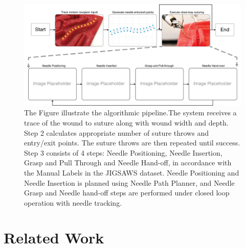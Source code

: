 \begin{figure}[!t]
\centering
\includegraphics[width=0.9\linewidth]{figures/fsm}
\caption{ The Figure illustrate the algorithmic pipeline.The system receives a trace of the wound to suture along with wound width and depth. Step 2 calculates appropriate number of suture throws and entry/exit points. The suture throws are then repeated until success. Step 3  consists of 4 steps: Needle Positioning, Needle Insertion, Grasp and Pull Through and Needle Hand-off, in accordance with the Manual Labels in the JIGSAWS dataset. Needle Positioning and Needle Insertion is planned using Needle Path Planner, and Needle Grasp and Needle hand-off steps are performed under closed loop operation with needle tracking.}
\label{fig:fsm}
\vspace{-10pt}
\end{figure}

\section{Related Work}
\label{sec:relWork}






